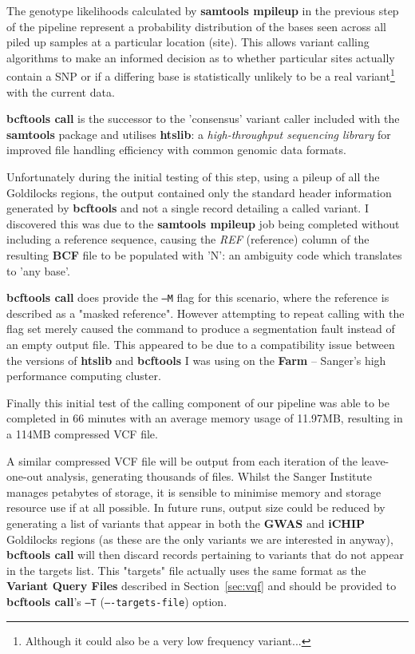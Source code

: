 The genotype likelihoods calculated by \textbf{samtools mpileup} in the previous
step of the pipeline represent a probability distribution of the bases seen
across all piled up samples at a particular location (site). This allows variant
calling algorithms to make an informed decision as to whether particular sites
actually contain a SNP or if a differing base is statistically unlikely to be a real
variant\footnote{Although it could also be a very low frequency variant...} with
the current data.

\textbf{bcftools call}\citep{man:bcftools-call}\citep{man:bcftools-call2} is the
successor to the 'consensus' variant caller included with the \textbf{samtools}
package and utilises \textbf{htslib}: a \textit{high-throughput sequencing
library} for improved file handling efficiency with common genomic data formats.


Unfortunately during the initial testing of this step, using a pileup of all the
Goldilocks regions, the output contained only the standard header information
generated by \textbf{bcftools} and not a single record detailing a called
variant.  I discovered this was due to the \textbf{samtools mpileup} job being
completed without including a reference sequence, causing the \textit{REF}
(reference) column of the resulting \textbf{BCF} file to be populated with 'N':
an ambiguity code which translates to 'any
base'\citep{cornish1985nomenclature}\citep{liebecq1992biochemical}.

\textbf{bcftools call} does provide the \texttt{--M} flag for this scenario,
where the reference is described as a "masked reference". However attempting to
repeat calling with the flag set merely caused the command to produce a
segmentation fault instead of an empty output file. This appeared to be due to a
compatibility issue between the versions of \textbf{htslib} and
\textbf{bcftools} I was using on the \textbf{Farm} -- Sanger's high performance
computing cluster.

Finally this initial test of the calling component of our pipeline was able to
be completed in 66 minutes with an average memory usage of 11.97MB, resulting in
a 114MB compressed VCF file.

A similar compressed VCF file will be output from each iteration of the
leave-one-out analysis, generating thousands of files.  Whilst the Sanger
Institute manages petabytes of storage, it is sensible to minimise memory and
storage resource use if at all possible.  In future runs, output size could be
reduced by generating a list of variants that appear in both the \textbf{GWAS}
and \textbf{iCHIP} Goldilocks regions (as these are the only variants we are
interested in anyway), \textbf{bcftools call} will then discard records
pertaining to variants that do not appear in the targets list. This "targets"
file actually uses the same format as the \textbf{Variant Query Files} described
in Section~\ref{sec:vqf} and should be provided to \textbf{bcftools call}'s
\texttt{--T} (\texttt{----targets-file}) option.


